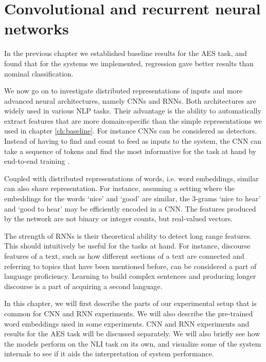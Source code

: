 \chapter{Convolutional and recurrent neural networks} \label{ch:sequencemodels}

In the previous chapter we established baseline results for the \ac{AES} task,
and found that for the systems we implemented, regression gave better results
than nominal classification.

We now go on to investigate distributed representations of inputs and more
advanced neural architectures, namely \acp{CNN} and \acp{RNN}. Both
architectures are widely used in various \ac{NLP} tasks. Their advantage is
the ability to automatically extract features that are more domain-specific
than the simple representations we used in chapter \ref{ch:baseline}. For
instance \acp{CNN} can be considered as \ngram detectors. Instead of having
to find and count \ngrams to feed as inputs to the system, the \ac{CNN} can
take a sequence of tokens and find the most informative \ngrams for the task
at hand by end-to-end training \autocite[155]{goldbergNLP}.

Coupled with distributed representations of words, i.e. word embeddings,
similar \ngrams can also share representation. For instance, assuming a
setting where the embeddings for the words `nice' and `good' are similar, the
3-grams `nice to hear' and `good to hear' may be efficiently encoded in a
\ac{CNN}. The features produced by the network are not binary or integer
counts, but real-valued vectors.

The strength of \acp{RNN} is their theoretical ability to detect long range
features. This should intuitively be useful for the tasks at hand. For
instance, discourse features of a text, such as how different sections of a
text are connected and referring to topics that have been mentioned before,
can be considered a part of language proficiency. Learning to build complex
sentences and producing longer discourse is a part of acquiring a second
language.

In this chapter, we will first describe the parts of our experimental setup
that is common for CNN and RNN experiments. We will also describe the
pre-trained word embeddings used in some experiments. CNN and RNN experiments
and results for the \ac{AES} task will be discussed separately. We will also
briefly see how the models perform on the \ac{NLI} task on its own, and
visualize some of the system internals to see if it aids the interpretation
of system performance.


